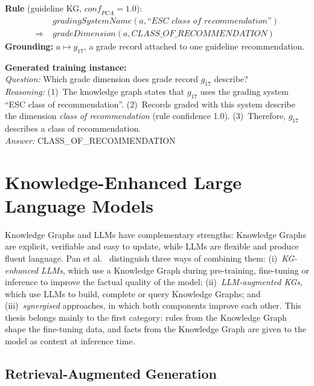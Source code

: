 \begin{bgexample}
\textbf{Rule} (guideline KG, $\mathit{conf}_{\mathit{PCA}} = 1.0$):
\begin{align*}
  &\mathit{gradingSystemName}(a, \textit{``ESC class of recommendation''})\\
  \Rightarrow\; &\mathit{gradeDimension}(a, \textit{CLASS\_OF\_RECOMMENDATION})
\end{align*}
\textbf{Grounding:} $a \mapsto g_{17}$, a grade record attached to one
guideline recommendation.\par\smallskip
\textbf{Generated training instance:}\\
\emph{Question:} Which grade dimension does grade record $g_{17}$ describe?\\
\emph{Reasoning:} (1)~The knowledge graph states that $g_{17}$ uses the
grading system ``ESC class of recommendation''. (2)~Records graded with this
system describe the dimension \emph{class of recommendation} (rule
confidence 1.0). (3)~Therefore, $g_{17}$ describes a class of
recommendation.\\
\emph{Answer:} CLASS\_OF\_RECOMMENDATION
\end{bgexample}

\section{Knowledge-Enhanced Large Language Models}
\label{sec:bg-kg-llm}

Knowledge Graphs and LLMs have complementary strengths: Knowledge Graphs are
explicit, verifiable and easy to update, while LLMs are flexible and
produce fluent language. Pan et al.~\cite{pan2024unifying} distinguish three
ways of combining them: (i)~\emph{KG-enhanced LLMs}, which use a Knowledge
Graph during pre-training, fine-tuning or inference to improve the factual
quality of the model; (ii)~\emph{LLM-augmented KGs}, which use LLMs to build,
complete or query Knowledge Graphs; and (iii)~\emph{synergised} approaches,
in which both components improve each other. This thesis belongs mainly to
the first category: rules from the Knowledge Graph shape the fine-tuning data,
and facts from the Knowledge Graph are given to the model as context at
inference time.

\subsection{Retrieval-Augmented Generation}
\label{sec:bg-rag}

